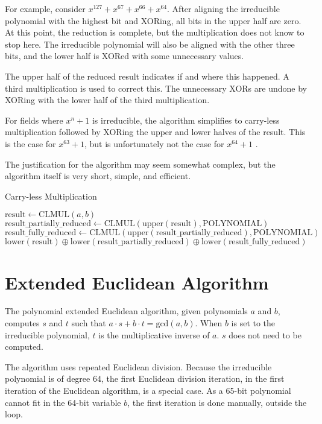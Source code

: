 For example, consider $x^{127} + x^{67} + x^{66} + x^{64}$.
After aligning the irreducible polynomial with the highest bit and XORing, all bits in the upper half are zero.
At this point, the reduction is complete, but the multiplication does not know to stop here.
The irreducible polynomial will also be aligned with the other three bits, and the lower half is XORed with some unnecessary values.

The upper half of the reduced result indicates if and where this happened. A third multiplication is used to correct this.
The unnecessary XORs are undone by XORing with the lower half of the third multiplication.

For fields where $x^{n} + 1$ is irreducible, the algorithm simplifies to carry-less multiplication followed by XORing the upper and lower halves of the result.
This is the case for $x^{63} + 1$, but is unfortunately not the case for $x^{64} + 1$ \cite{low-weight-polynomials}.

The justification for the algorithm may seem somewhat complex, but the algorithm itself is very short, simple, and efficient.

\begin{algorithm}
\caption{Carry-less Multiplication}
\begin{algorithmic}
\State $\text{result} \gets \text{CLMUL}(a, b)$
\State $\text{result\_partially\_reduced} \gets \text{CLMUL}(\text{upper}(\text{result}), \text{POLYNOMIAL})$
\State $\text{result\_fully\_reduced} \gets \text{CLMUL}(\text{upper}(\text{result\_partially\_reduced}), \text{POLYNOMIAL})$
\State \Return $\text{lower}(\text{result}) \oplus \text{lower}(\text{result\_partially\_reduced}) \oplus \text{lower}(\text{result\_fully\_reduced})$
\EndFunction
\end{algorithmic}
\end{algorithm}

\section{Extended Euclidean Algorithm}

The polynomial extended Euclidean algorithm, given polynomials $a$ and $b$, computes $s$ and $t$ such that $a \cdot s + b \cdot t = \text{gcd}(a, b)$.
When $b$ is set to the irreducible polynomial, $t$ is the multiplicative inverse of $a$. $s$ does not need to be computed.

The algorithm uses repeated Euclidean division.
Because the irreducible polynomial is of degree 64, the first Euclidean division iteration, in the first iteration of the Euclidean algorithm, is a special case.
As a 65-bit polynomial cannot fit in the 64-bit variable $b$, the first iteration is done manually, outside the loop.

